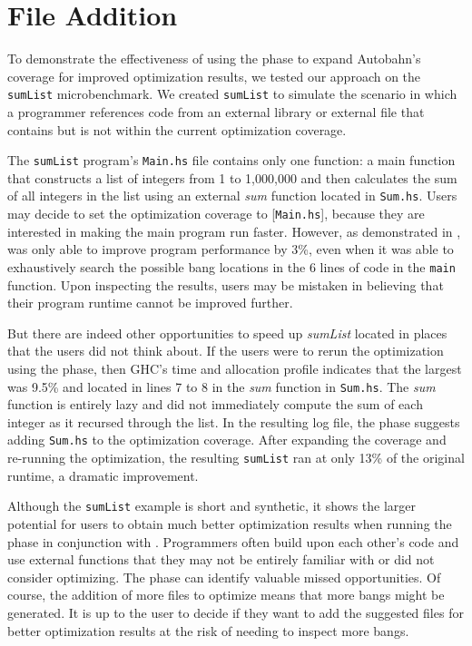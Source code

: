 \section{\Preopt{} File Addition}

To demonstrate the effectiveness of using the \preopt{} phase to
expand Autobahn's coverage for improved optimization results, we
tested our approach on the \texttt{sumList} microbenchmark. We
created \texttt{sumList} to simulate the scenario in which a
programmer references code from an external library or external file
that contains \hotspots{} but is not within the current optimization
coverage.

The \texttt{sumList} program's \texttt{Main.hs} file contains only one
function: a main function that constructs a list of integers from 1 to
1,000,000 and then calculates the sum of all integers in the list using an
external \textit{sum} function located in \texttt{Sum.hs}. Users
may decide to set the optimization coverage to [\texttt{Main.hs}],
because they are interested in making the main program run
faster. However, as demonstrated in , \Ao{} was only able to
improve program performance by 3\%, even when it was able to
exhaustively search the possible bang locations in the 6 lines of code in the \texttt{main}
function. Upon inspecting the results, users may be mistaken in
believing that their program runtime cannot be improved
further.

But there are indeed other opportunities to speed up \textit{sumList}
located in places that the users did not think about. If the users were
to rerun the optimization using the \preopt{} phase, then GHC's time and
allocation profile indicates that the largest \hotspotcost{} was 9.5\%
and located in lines 7 to 8 in the \textit{sum} function
in \texttt{Sum.hs}. The \textit{sum} function is entirely lazy and did
not immediately compute the sum of each integer as it recursed through
the list. In the resulting log file, the \preopt{} phase
suggests
adding \texttt{Sum.hs} to the optimization coverage.
After expanding the coverage and re-running the optimization,
the resulting \texttt{sumList} ran at only 13\% of the original
runtime, a dramatic improvement.

Although the \texttt{sumList} example is short and synthetic, it shows
the larger potential for users to obtain much better optimization
results when running the \preopt{} phase in conjunction
with \Ao{}. Programmers often build upon each other's code and use
external functions that they may not be entirely familiar with or did
not consider optimizing. The \preopt{} phase can identify valuable
missed opportunities. Of
course, the addition of more files to optimize means that more bangs
might be generated. It is up to the user to decide if they want to add
the suggested files for better optimization results at the risk of
needing to inspect more bangs.
\newline

